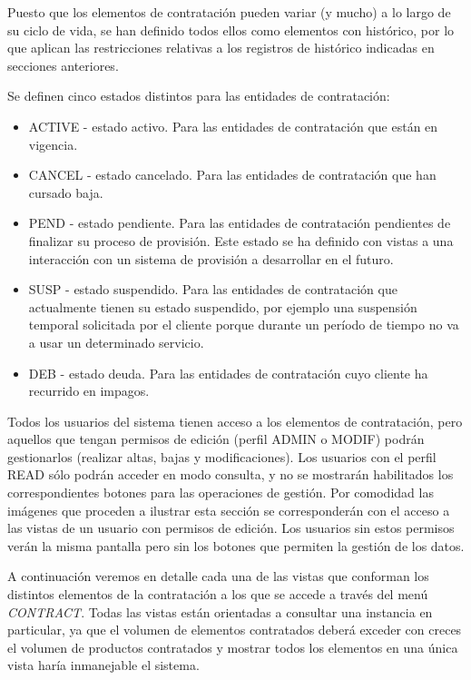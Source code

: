Puesto que los elementos de contratación pueden variar (y mucho) a lo largo de su ciclo de vida, se han definido todos ellos como elementos con histórico, por lo que aplican las restricciones relativas a los registros de histórico indicadas en secciones anteriores.

Se definen cinco estados distintos para las entidades de contratación:

\begin{itemize}
\item ACTIVE - estado activo. Para las entidades de contratación que están en vigencia.
\item CANCEL - estado cancelado. Para las entidades de contratación que han cursado baja.
\item PEND - estado pendiente. Para las entidades de contratación pendientes de finalizar su proceso de provisión. Este estado se ha definido con vistas a una interacción con un sistema de provisión a desarrollar en el futuro.
\item SUSP - estado suspendido. Para las entidades de contratación que actualmente tienen su estado suspendido, por ejemplo una suspensión temporal solicitada por el cliente porque durante un período de tiempo no va a usar un determinado servicio.
\item DEB - estado deuda. Para las entidades de contratación cuyo cliente ha recurrido en impagos.
\end{itemize}


Todos los usuarios del sistema tienen acceso a los elementos de contratación, pero aquellos que tengan permisos de edición (perfil ADMIN o MODIF) podrán gestionarlos (realizar altas, bajas y modificaciones). Los usuarios con el perfil READ sólo podrán acceder en modo consulta, y no se mostrarán habilitados los correspondientes botones para las operaciones de gestión. Por comodidad las imágenes que proceden a ilustrar esta sección se corresponderán con el acceso a las vistas de un usuario con permisos de edición. Los usuarios sin estos permisos verán la misma pantalla pero sin los botones que permiten la gestión de los datos.

A continuación veremos en detalle cada una de las vistas que conforman los distintos elementos de la contratación a los que se accede a través del menú  \emph{CONTRACT}. Todas las vistas están orientadas a consultar una instancia en particular, ya que el volumen de elementos contratados deberá exceder con creces el volumen de productos contratados y mostrar todos los elementos en una única vista haría inmanejable el sistema.



